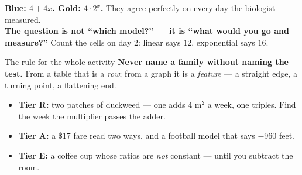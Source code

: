 \documentclass[aspectratio=169, 11pt]{beamer}
\begin{document}
\begin{frame}[t, plain]
  \begin{center}
  \end{center}
  \vspace{-0.35cm}
  \small
  \textbf{Blue: $4+4x$. \quad Gold: $4 \cdot 2^{x}$.} They agree perfectly on every day the biologist
  measured.\\[0.1cm]
  \textbf{The question is not ``which model?'' --- it is ``what would you go and measure?''} Count the
  cells on day $2$: linear says $12$, exponential says $16$.
\end{frame}

\begin{frame}[t, plain]
  \begin{block}{The rule for the whole activity}
    \textbf{Never name a family without naming the test.} From a table that is a \emph{row}; from a
    graph it is a \emph{feature} --- a straight edge, a turning point, a flattening end.
  \end{block}
  \vspace{0.1cm}
  \begin{itemize}
    \setlength{\itemsep}{0.25cm}
    \item \textbf{Tier R:} two patches of duckweed --- one adds $4$ m$^2$ a week, one triples. Find
          the week the multiplier passes the adder.
    \item \textbf{Tier A:} a \$17 fare read two ways, and a football model that says $-960$ feet.
    \item \textbf{Tier E:} a coffee cup whose ratios are \emph{not} constant --- until you subtract
          the room.
  \end{itemize}
\end{frame}
\end{document}
